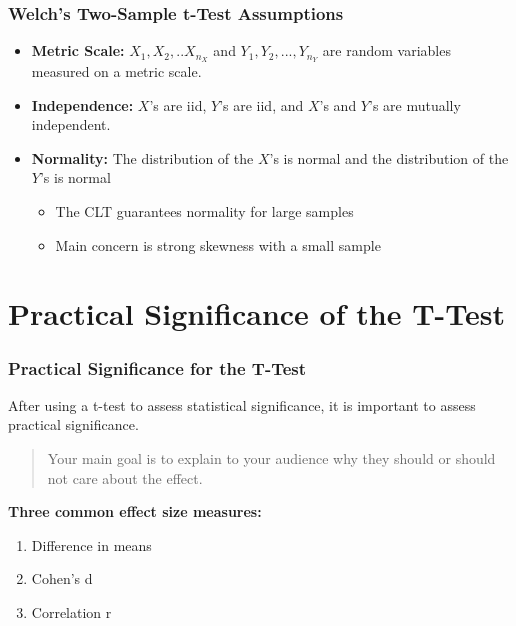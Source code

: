 \documentclass[12pt, block=fill]{beamer}
\begin{document}
\begin{frame}
  \frametitle{Welch's Two-Sample t-Test Assumptions}
  
  \begin{itemize}
  \item \textbf{Metric Scale:} $X_1, X_2,..X_{n_X}$ and $Y_1, Y_2,...,Y_{n_Y}$ are random variables measured on a metric scale.
  \item \textbf{Independence:} $X$'s are iid, $Y$'s are iid, and $X$'s and $Y$'s are mutually independent.
  \item \textbf{Normality:} The distribution of the $X$'s is normal and the distribution of the $Y$'s is normal
  \begin{itemize}
\item The CLT guarantees normality for large samples
\item Main concern is strong skewness with a small sample
\end{itemize}

  \end{itemize}

  
\end{frame}







\section{Practical Significance of the T-Test}
\begin{frame}
  \frametitle{Practical Significance for the T-Test}

  After using a t-test to assess statistical significance, it is
  important to assess practical significance. \\ \vspace{1em}

  \begin{quote}
    Your main goal is to explain to your audience
    why they should or should not care about the effect.
  \end{quote}

  \textbf{Three common effect size measures:}

  \begin{enumerate}
  \item Difference in means
  \item Cohen's d
  \item Correlation r
  \end{enumerate}
\end{frame}
\end{document}
